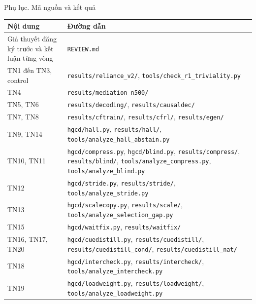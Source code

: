 \documentclass[aspectratio=169,t,10pt]{beamer}
\newcommand{\code}[1]{\texttt{#1}}
\begin{document}
\begin{frame}[shrink]{Phụ lục. Mã nguồn và kết quả}
\small
\renewcommand{\arraystretch}{1.25}
\begin{tabularx}{\textwidth}{@{}P{5.2cm}Y@{}}
\toprule
\textbf{Nội dung} & \textbf{Đường dẫn}\\
\midrule
Giả thuyết đăng ký trước và kết luận từng vòng & \code{REVIEW.md}\\
TN1 đến TN3, control & \code{results/reliance\_v2/}, \code{tools/check\_r1\_triviality.py}\\
TN4 & \code{results/mediation\_n500/}\\
TN5, TN6 & \code{results/decoding/}, \code{results/causaldec/}\\
TN7, TN8 & \code{results/cftrain/}, \code{results/cfrl/}, \code{results/egen/}\\
TN9, TN14 & \code{hgcd/hall.py}, \code{results/hall/}, \code{tools/analyze\_hall\_abstain.py}\\
TN10, TN11 & \code{hgcd/compress.py}, \code{hgcd/blind.py}, \code{results/compress/}, \code{results/blind/}, \code{tools/analyze\_compress.py}, \code{tools/analyze\_blind.py}\\
TN12 & \code{hgcd/stride.py}, \code{results/stride/}, \code{tools/analyze\_stride.py}\\
TN13 & \code{hgcd/scalecopy.py}, \code{results/scale/}, \code{tools/analyze\_selection\_gap.py}\\
TN15 & \code{hgcd/waitfix.py}, \code{results/waitfix/}\\
TN16, TN17, TN20 & \code{hgcd/cuedistill.py}, \code{results/cuedistill/}, \code{results/cuedistill\_cond/}, \code{results/cuedistill\_nat/}\\
TN18 & \code{hgcd/intercheck.py}, \code{results/intercheck/}, \code{tools/analyze\_intercheck.py}\\
TN19 & \code{hgcd/loadweight.py}, \code{results/loadweight/}, \code{tools/analyze\_loadweight.py}\\
\bottomrule
\end{tabularx}
\end{frame}
\end{document}
